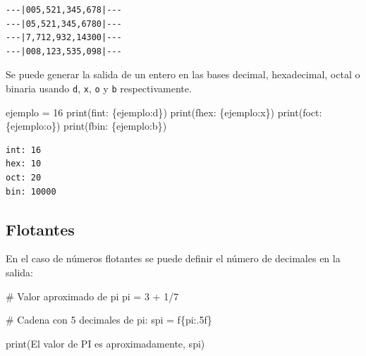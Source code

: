 \documentclass[
  spanish,
  letterpaper,
]{scrbook}
\newenvironment{Shaded}{\begin{snugshade}}{\end{snugshade}}
\newcommand{\BuiltInTok}[1]{\textcolor[rgb]{0.00,0.23,0.31}{#1}}
\newcommand{\CommentTok}[1]{\textcolor[rgb]{0.37,0.37,0.37}{#1}}
\newcommand{\DecValTok}[1]{\textcolor[rgb]{0.68,0.00,0.00}{#1}}
\newcommand{\NormalTok}[1]{\textcolor[rgb]{0.00,0.23,0.31}{#1}}
\newcommand{\OperatorTok}[1]{\textcolor[rgb]{0.37,0.37,0.37}{#1}}
\newcommand{\SpecialCharTok}[1]{\textcolor[rgb]{0.37,0.37,0.37}{#1}}
\newcommand{\SpecialStringTok}[1]{\textcolor[rgb]{0.13,0.47,0.30}{#1}}
\newcommand{\StringTok}[1]{\textcolor[rgb]{0.13,0.47,0.30}{#1}}
\theoremstyle{definition}
\theoremstyle{remark}
\begin{document}
\begin{verbatim}
---|005,521,345,678|---
---|05,521,345,6780|---
---|7,712,932,14300|---
---|008,123,535,098|---
\end{verbatim}

Se puede generar la salida de un entero en las bases decimal,
hexadecimal, octal o binaria usando \texttt{d}, \texttt{x}, \texttt{o} y
\texttt{b} respectivamente.

\begin{Shaded}
\begin{Highlighting}[]
\NormalTok{ejemplo }\OperatorTok{=} \DecValTok{16}
\BuiltInTok{print}\NormalTok{(}\SpecialStringTok{f\textquotesingle{}int: }\SpecialCharTok{\{}\NormalTok{ejemplo}\SpecialCharTok{:d\}}\SpecialStringTok{\textquotesingle{}}\NormalTok{)}
\BuiltInTok{print}\NormalTok{(}\SpecialStringTok{f\textquotesingle{}hex: }\SpecialCharTok{\{}\NormalTok{ejemplo}\SpecialCharTok{:x\}}\SpecialStringTok{\textquotesingle{}}\NormalTok{)}
\BuiltInTok{print}\NormalTok{(}\SpecialStringTok{f\textquotesingle{}oct: }\SpecialCharTok{\{}\NormalTok{ejemplo}\SpecialCharTok{:o\}}\SpecialStringTok{\textquotesingle{}}\NormalTok{)}
\BuiltInTok{print}\NormalTok{(}\SpecialStringTok{f\textquotesingle{}bin: }\SpecialCharTok{\{}\NormalTok{ejemplo}\SpecialCharTok{:b\}}\SpecialStringTok{\textquotesingle{}}\NormalTok{)}
\end{Highlighting}
\end{Shaded}

\begin{verbatim}
int: 16
hex: 10
oct: 20
bin: 10000
\end{verbatim}

\subsection{Flotantes}\label{flotantes}

En el caso de números flotantes se puede definir el número de decimales
en la salida:

\begin{Shaded}
\begin{Highlighting}[]
\CommentTok{\# Valor aproximado de pi}
\NormalTok{pi }\OperatorTok{=} \DecValTok{3} \OperatorTok{+} \DecValTok{1}\OperatorTok{/}\DecValTok{7}

\CommentTok{\# Cadena con 5 decimales de pi:}
\NormalTok{spi }\OperatorTok{=} \SpecialStringTok{f\textquotesingle{}}\SpecialCharTok{\{}\NormalTok{pi}\SpecialCharTok{:.5f\}}\SpecialStringTok{\textquotesingle{}}

\BuiltInTok{print}\NormalTok{(}\StringTok{\textquotesingle{}El valor de PI es aproximadamente\textquotesingle{}}\NormalTok{, spi) }
\end{Highlighting}
\end{Shaded}
\end{document}

